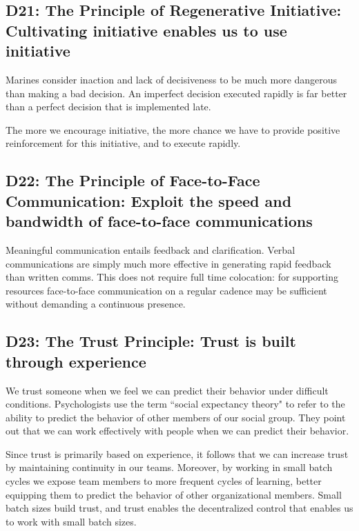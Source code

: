 \documentclass{article}
\begin{document}
\begin{multicols}{2}

\subsection{D21: The Principle of Regenerative Initiative: Cultivating initiative enables us to use initiative}

Marines consider inaction and lack of decisiveness to be much more dangerous than making a bad decision. An imperfect decision executed rapidly is far better than a perfect decision that is implemented late.

The more we encourage initiative, the more chance we have to provide positive reinforcement for this initiative, and to execute rapidly.

\subsection{D22: The Principle of Face-to-Face Communication: Exploit the speed and bandwidth of face-to-face communications}

Meaningful communication entails feedback and clarification. Verbal communications are simply much more effective in generating rapid feedback than written comms. This does not require full time colocation: for supporting resources face-to-face communication on a regular cadence may be sufficient without demanding a continuous presence.

\subsection{D23: The Trust Principle: Trust is built through experience}

We trust someone when we feel we can predict their behavior under difficult conditions. Psychologists use the term ``social expectancy theory" to refer to the ability to predict the behavior of other members of our social group. They point out that we can work effectively with people when we can predict their behavior.

Since trust is primarily based on experience, it follows that we can increase trust by maintaining continuity in our teams. Moreover, by working in small batch cycles we expose team members to more frequent cycles of learning, better equipping them to predict the behavior of other organizational members. Small batch sizes build trust, and trust enables the decentralized control that enables us to work with small batch sizes.

\end{multicols}
\end{document}
